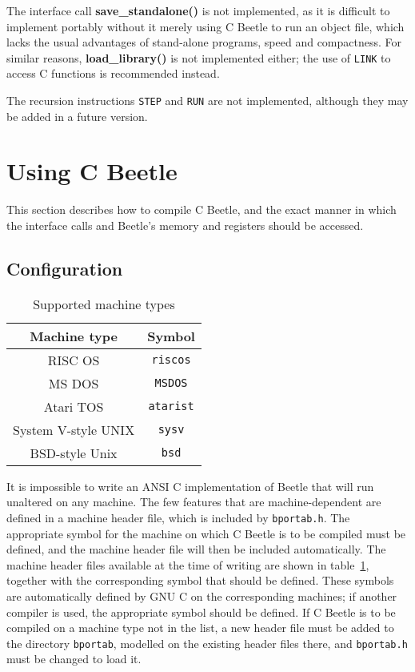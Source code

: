 The interface call {\bf save\_standalone()} is not implemented, as it is
difficult to implement portably without it merely using C Beetle to run an
object file, which lacks the usual advantages of stand-alone programs, speed
and compactness. For similar reasons, {\bf load\_library()} is not
implemented either; the use of {\tt LINK} to access C functions is
recommended instead.

The recursion instructions {\tt STEP} and {\tt RUN} are not implemented,
although they may be added in a future version.


\section{Using C Beetle}

This section describes how to compile C Beetle, and the exact manner in which
the interface calls and Beetle's memory and registers should be accessed.


\subsection{Configuration}
\label{configuration}

\begin{table}
\begin{center}
\begin{tabular}{|c|c|} \hline
\rule[-2mm]{0mm}{6mm}\bf Machine type & \bf Symbol \\ \hline
RISC OS & {\tt riscos} \\
MS DOS & {\tt MSDOS} \\
Atari TOS & {\tt atarist} \\
System V-style UNIX & {\tt sysv} \\
BSD-style Unix & {\tt bsd} \\
\hline
\end{tabular}
\caption{\label{machtab}Supported machine types}
\end{center}
\end{table}

It is impossible to write an ANSI C implementation of Beetle that will run
unaltered on any machine. The few features that are machine-dependent are
defined in a machine header file, which is included by {\tt bportab.h}. The
appropriate symbol for the machine on which C Beetle is to be compiled must
be defined, and the machine header file will then be included automatically.
The machine header files available at the time of writing are shown in
table~\ref{machtab}, together with the corresponding symbol that should be
defined. These symbols are automatically defined by GNU C on the
corresponding machines; if another compiler is used, the appropriate symbol
should be defined. If C Beetle is to be compiled on a machine type not in the
list, a new header file must be added to the directory {\tt bportab},
modelled on the existing header files there, and {\tt bportab.h} must be
changed to load it.

